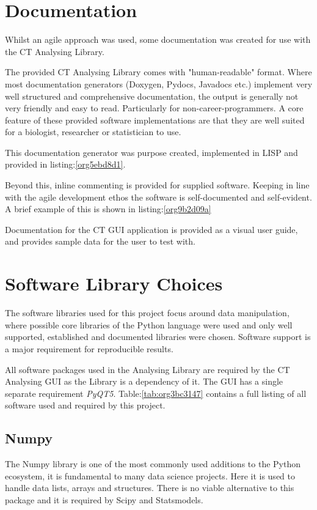 \documentclass[11pt]{report}
\begin{document}
\section{Documentation}
\label{sec:org533f176}
Whilst an agile approach was used, some documentation was created for use with the CT Analysing Library.

The provided CT Analysing Library comes with "human-readable" format. Where most documentation generators (Doxygen, Pydocs, Javadocs etc.) implement very well structured and comprehensive documentation, the output is generally not very friendly and easy to read. Particularly for non-career-programmers. A core feature of these provided software implementations are that they are well suited for a biologist, researcher or statistician to use.

This documentation generator was purpose created, implemented in LISP and provided in listing:\ref{org5ebd8d1}.

Beyond this, inline commenting is provided for supplied software. Keeping in line with the agile development ethos the software is self-documented and self-evident. A brief example of this is shown in listing:\ref{org9b2d09a}

Documentation for the CT GUI application is provided as a visual user guide, and provides sample data for the user to test with.
\section{Software Library Choices}
\label{sec:orgcb535df}
The software libraries used for this project focus around data manipulation, where possible core libraries of the Python language were used and only well supported, established and documented libraries were chosen. Software support is a major requirement for reproducible results.

All software packages used in the Analysing Library are required by the CT Analysing GUI as the Library is a dependency of it. The GUI has a single separate requirement \emph{PyQT5}.
Table:\ref{tab:org3bc3147} contains a full listing of all software used and required by this project.
\subsection{Numpy}
\label{sec:org2fe63c9}
The Numpy library is one of the most commonly used additions to the Python ecosystem, it is fundamental to many data science projects. Here it is used to handle data lists, arrays and structures. There is no viable alternative to this package and it is required by Scipy and Statsmodels.
\end{document}
